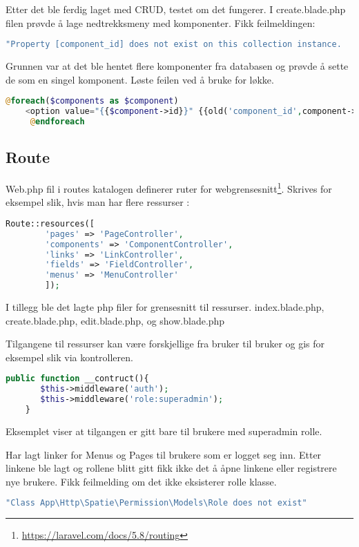 

Etter det ble ferdig laget med CRUD, testet om det fungerer.
I create.blade.php filen prøvde å lage nedtrekksmeny med komponenter.
Fikk feilmeldingen:
\begin{lstlisting}[language=PHP]
    "Property [component_id] does not exist on this collection instance.
\end{lstlisting}

Grunnen var at det ble hentet flere komponenter fra databasen og prøvde å sette de som en singel komponent.
Løste feilen ved å bruke for løkke.
\begin{lstlisting}[language=PHP]
    @foreach($components as $component)
    <option value="{{$component->id}}" {{old('component_id',component->id)}}? selected> {{$component->name}} </option>
     @endforeach
\end{lstlisting}

\subsection{Route}
Web.php fil i routes katalogen definerer  ruter  for webgrensesnitt\footnote{\url{https://laravel.com/docs/5.8/routing}}.
Skrives for eksempel slik, hvis man har flere ressurser :
\begin{lstlisting}[language=PHP]
    Route::resources([
        'pages' => 'PageController',
        'components' => 'ComponentController',
        'links' => 'LinkController',
        'fields' => 'FieldController',
        'menus' => 'MenuController'
        ]);
\end{lstlisting}

I tillegg ble det lagte php filer for grensesnitt til ressurser. index.blade.php, create.blade.php, edit.blade.php, og show.blade.php
\cite{savani2018lcrud}

Tilgangene til ressurser kan være forskjellige fra bruker til bruker og gis for eksempel slik via kontrolleren.
\begin{lstlisting}[language=PHP]
    public function __contruct(){
       $this->middleware('auth');
       $this->middleware('role:superadmin');
    }
\end{lstlisting}

Eksemplet viser at tilgangen er gitt bare til brukere med superadmin rolle.

Har lagt linker for Menus og Pages til brukere som er logget seg inn.
Etter linkene ble lagt og rollene blitt gitt fikk ikke det å åpne linkene eller registrere nye brukere. Fikk feilmelding om det ikke eksisterer rolle klasse.
\begin{lstlisting}[language=PHP]
    "Class App\Http\Spatie\Permission\Models\Role does not exist"
\end{lstlisting}

